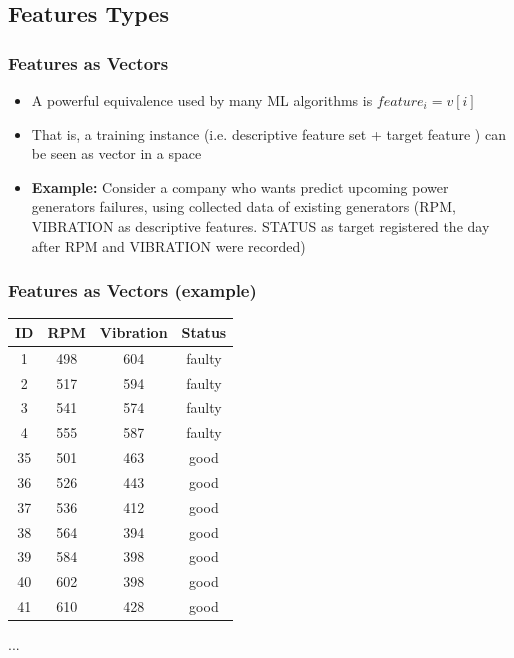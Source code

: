 \documentclass{beamer}
\begin{document}
\subsection{Features Types}
\begin{frame}
  \frametitle{Features as Vectors}
  \begin{itemize}
	\item<+-> A powerful equivalence used by many ML algorithms is $ feature_i = v[i] $
	\item<+-> That is, a training instance (i.e. descriptive feature set + target feature ) can be seen as vector in a space
	\item<+-> \textbf{Example:} Consider a company who wants predict upcoming power generators failures, using collected data of existing generators (RPM, VIBRATION as descriptive features. STATUS as target registered the day after RPM and VIBRATION were recorded)  
   \end{itemize}
\end{frame}

\begin{frame}
  \frametitle{Features as Vectors (example)}
\begin{center}
 \begin{tabular}{c c c c} 
 \hline
 ID & RPM & Vibration & Status \\ [0.5ex] 
 \hline
1 & 498 & 604 & faulty \\
2 & 517 & 594 & faulty \\
3 & 541 & 574 & faulty \\
4 & 555 & 587 & faulty \\
35 & 501 & 463 & good \\
36 & 526 & 443 & good \\
37 & 536 & 412 & good \\
38 & 564 & 394 & good \\
39 & 584 & 398 & good \\
40 & 602 & 398 & good \\
41 & 610 & 428 & good \\
\end{tabular}
\end{center}
\begin{center}
...
\end{center}
\end{frame}
\end{document}
